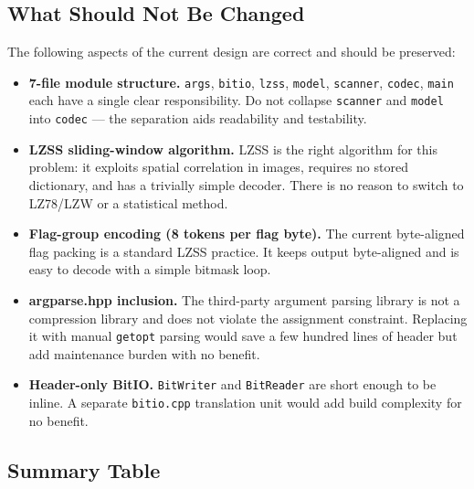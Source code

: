 \subsection{What Should Not Be Changed}

The following aspects of the current design are correct and should be preserved:

\begin{itemize}
  \item \textbf{7-file module structure.}
        \texttt{args}, \texttt{bitio}, \texttt{lzss}, \texttt{model}, \texttt{scanner},
        \texttt{codec}, \texttt{main} each have a single clear responsibility.
        Do not collapse \texttt{scanner} and \texttt{model} into \texttt{codec} ---
        the separation aids readability and testability.

  \item \textbf{LZSS sliding-window algorithm.}
        LZSS is the right algorithm for this problem: it exploits spatial correlation
        in images, requires no stored dictionary, and has a trivially simple decoder.
        There is no reason to switch to LZ78/LZW or a statistical method.

  \item \textbf{Flag-group encoding (8 tokens per flag byte).}
        The current byte-aligned flag packing is a standard LZSS practice.
        It keeps output byte-aligned and is easy to decode with a simple bitmask loop.

  \item \textbf{argparse.hpp inclusion.}
        The third-party argument parsing library is not a compression library and
        does not violate the assignment constraint.
        Replacing it with manual \texttt{getopt} parsing would save a few hundred
        lines of header but add maintenance burden with no benefit.

  \item \textbf{Header-only BitIO.}
        \texttt{BitWriter} and \texttt{BitReader} are short enough to be inline.
        A separate \texttt{bitio.cpp} translation unit would add build complexity
        for no benefit.
\end{itemize}

\subsection{Summary Table}

